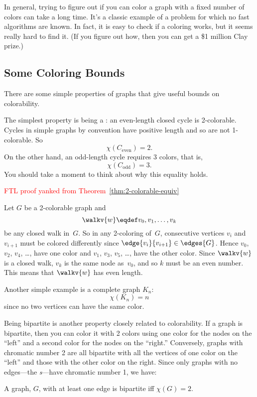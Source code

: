 In general, trying to figure out if you can color a graph with a fixed
number of colors can take a long time.  It's a classic example of a
problem for which no fast algorithms are known.  In fact, it is easy to
check if a coloring works, but it seems really hard to find it. (If you
figure out how, then you can get a \$1 million Clay prize.)


\subsection{Some Coloring Bounds}

There are some simple properties of graphs that give useful bounds on
colorability. 

The simplest property is being a : an even-length closed
cycle is 2-colorable.  Cycles in simple graphs by convention have
positive length and so are not 1-colorable.  So
\[
\chi(C_{\text{even}}) = 2.
\]
On the other hand, an odd-length cycle requires 3 colors, that is,
\begin{equation}\label{Codd3}
\chi(C_{\text{odd}}) = 3.
\end{equation}
You should take a moment to think about why this equality holds.

\begin{editingnotes}
\textcolor{red}{FTL proof yanked from
  Theorem~\ref{thm:2-colorable-equiv}}

Let $G$ be a 2-colorable graph and
\begin{equation*}
    \walkv{w} \eqdef v_0, v_1, \dots, v_k
\end{equation*}
be any closed walk in~$G$.  So in any 2-coloring of~$G$, consecutive
vertices $v_i$ and $v_{i + 1}$ must be colored differently since
$\edge{v_i}{v_{i + 1}} \in \edges{G}$.
Hence $v_0$, $v_2$, $v_4$, \dots, have one color and $v_1$, $v_3$,
$v_5$, \dots, have the other color.  Since $\walkv{w}$ is a closed
walk, $v_k$ is the same node as~$v_0$, and so $k$ must be an even
number.  This means that $\walkv{w}$ has even length.
\end{editingnotes}
Another simple example is a complete graph $K_n$:
\[
\chi(K_n) = n
\]
since no two vertices can have the same color.

Being bipartite is another property closely related to colorability.
If a graph is bipartite, then you can color it with 2 colors using one
color for the nodes on the ``left'' and a second color for the nodes
on the ``right.''  Conversely, graphs with chromatic number 2 are all
bipartite with all the vertices of one color on the ``left'' and those
with the other color on the right.  Since only graphs with no
edges---the \emph{s}---have chromatic number 1, we
have: \iffalse Empty graphs are bipartite as long they have at least
two vertices: a graph with only one vertex is not bipartite because
its vertex set cannot be partitioned into two \emph{nonempty}
subsets.\fi
\begin{lemma}\label{2color-iff-bip}
A graph, $G$, with at least one edge is bipartite iff $\chi(G) = 2$.
\end{lemma}

